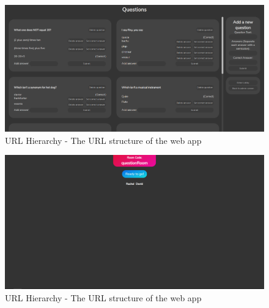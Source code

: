 \documentclass[10pt, a4paper]{article}
\begin{document}
\begin{figure}
\includegraphics[width=\textwidth]{questionEditScreen.PNG}
\caption[width=\textwidth]{URL Hierarchy - The URL structure of the web app} \label{questionEditScreen}
\end{figure}

\begin{figure}
\includegraphics[width=\textwidth]{lobbyScreen.PNG}
\caption[width=\textwidth]{URL Hierarchy - The URL structure of the web app} \label{lobbyScreen}
\end{figure}
\end{document}
